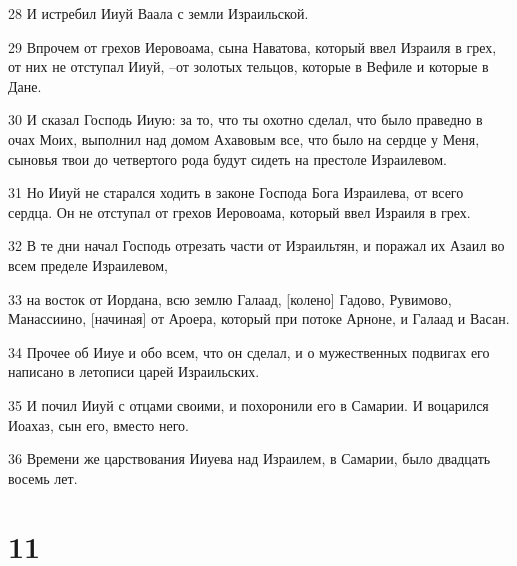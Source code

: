\par 28 И истребил Ииуй Ваала с земли Израильской.
\par 29 Впрочем от грехов Иеровоама, сына Наватова, который ввел Израиля в грех, от них не отступал Ииуй, --от золотых тельцов, которые в Вефиле и которые в Дане.
\par 30 И сказал Господь Ииую: за то, что ты охотно сделал, что было праведно в очах Моих, выполнил над домом Ахавовым все, что было на сердце у Меня, сыновья твои до четвертого рода будут сидеть на престоле Израилевом.
\par 31 Но Ииуй не старался ходить в законе Господа Бога Израилева, от всего сердца. Он не отступал от грехов Иеровоама, который ввел Израиля в грех.
\par 32 В те дни начал Господь отрезать части от Израильтян, и поражал их Азаил во всем пределе Израилевом,
\par 33 на восток от Иордана, всю землю Галаад, [колено] Гадово, Рувимово, Манассиино, [начиная] от Ароера, который при потоке Арноне, и Галаад и Васан.
\par 34 Прочее об Ииуе и обо всем, что он сделал, и о мужественных подвигах его написано в летописи царей Израильских.
\par 35 И почил Ииуй с отцами своими, и похоронили его в Самарии. И воцарился Иоахаз, сын его, вместо него.
\par 36 Времени же царствования Ииуева над Израилем, в Самарии, было двадцать восемь лет.

\chapter{11}

